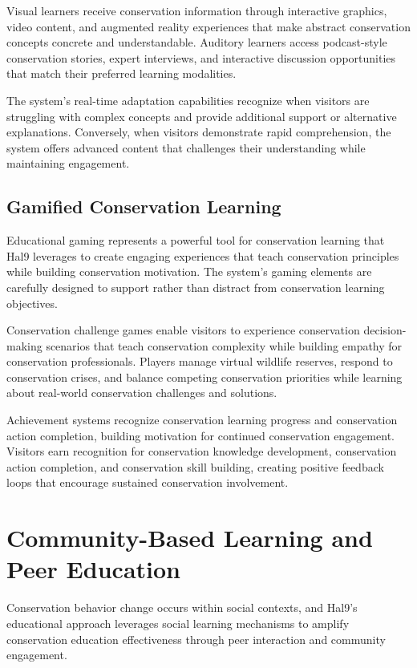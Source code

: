 \documentclass[
  Letterpaper,
]{scrbook}
\begin{document}
Visual learners receive conservation information through interactive
graphics, video content, and augmented reality experiences that make
abstract conservation concepts concrete and understandable. Auditory
learners access podcast-style conservation stories, expert interviews,
and interactive discussion opportunities that match their preferred
learning modalities.

The system's real-time adaptation capabilities recognize when visitors
are struggling with complex concepts and provide additional support or
alternative explanations. Conversely, when visitors demonstrate rapid
comprehension, the system offers advanced content that challenges their
understanding while maintaining engagement.

\subsection{Gamified Conservation
Learning}\label{gamified-conservation-learning}

Educational gaming represents a powerful tool for conservation learning
that Hal9 leverages to create engaging experiences that teach
conservation principles while building conservation motivation. The
system's gaming elements are carefully designed to support rather than
distract from conservation learning objectives.

Conservation challenge games enable visitors to experience conservation
decision-making scenarios that teach conservation complexity while
building empathy for conservation professionals. Players manage virtual
wildlife reserves, respond to conservation crises, and balance competing
conservation priorities while learning about real-world conservation
challenges and solutions.

Achievement systems recognize conservation learning progress and
conservation action completion, building motivation for continued
conservation engagement. Visitors earn recognition for conservation
knowledge development, conservation action completion, and conservation
skill building, creating positive feedback loops that encourage
sustained conservation involvement.

\section{Community-Based Learning and Peer
Education}\label{community-based-learning-and-peer-education}

Conservation behavior change occurs within social contexts, and Hal9's
educational approach leverages social learning mechanisms to amplify
conservation education effectiveness through peer interaction and
community engagement.
\end{document}
